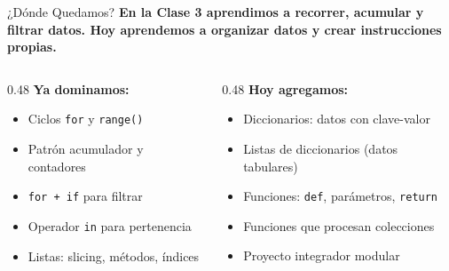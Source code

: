 \documentclass[aspectratio=169, 11pt]{beamer}
\begin{document}
\begin{frame}{¿Dónde Quedamos?}
  \vspace{-6pt}
  {\small\color{arcaDark}\bfseries
    En la Clase 3 aprendimos a recorrer, acumular y filtrar datos.
    Hoy aprendemos a \textbf{organizar} datos y \textbf{crear instrucciones propias}.}

  \vspace{8pt}
  \begin{columns}[T]
    \begin{column}{0.48\textwidth}
      {\footnotesize\color{arcaDark}\bfseries Ya dominamos:}
      \vspace{4pt}
      {\footnotesize
      \begin{itemize}\setlength{\itemsep}{3pt}
        \item[{\color{codeGreen}\scriptsize\faCheck}]
          Ciclos \texttt{for} y \texttt{range()}
        \item[{\color{codeGreen}\scriptsize\faCheck}]
          Patrón acumulador y contadores
        \item[{\color{codeGreen}\scriptsize\faCheck}]
          \texttt{for + if} para filtrar
        \item[{\color{codeGreen}\scriptsize\faCheck}]
          Operador \texttt{in} para pertenencia
        \item[{\color{codeGreen}\scriptsize\faCheck}]
          Listas: slicing, métodos, índices
      \end{itemize}
      }
    \end{column}

    \begin{column}{0.48\textwidth}
      {\footnotesize\color{arcaDark}\bfseries Hoy agregamos:}
      \vspace{4pt}
      {\footnotesize
      \begin{itemize}\setlength{\itemsep}{3pt}
        \item[{\color{arcaRed}\scriptsize\faArrowRight}]
          Diccionarios: datos con clave-valor
        \item[{\color{arcaRed}\scriptsize\faArrowRight}]
          Listas de diccionarios (datos tabulares)
        \item[{\color{arcaRed}\scriptsize\faArrowRight}]
          Funciones: \texttt{def}, parámetros, \texttt{return}
        \item[{\color{arcaRed}\scriptsize\faArrowRight}]
          Funciones que procesan colecciones
        \item[{\color{arcaRed}\scriptsize\faArrowRight}]
          Proyecto integrador modular
      \end{itemize}
      }
    \end{column}
  \end{columns}
\end{frame}
\end{document}
